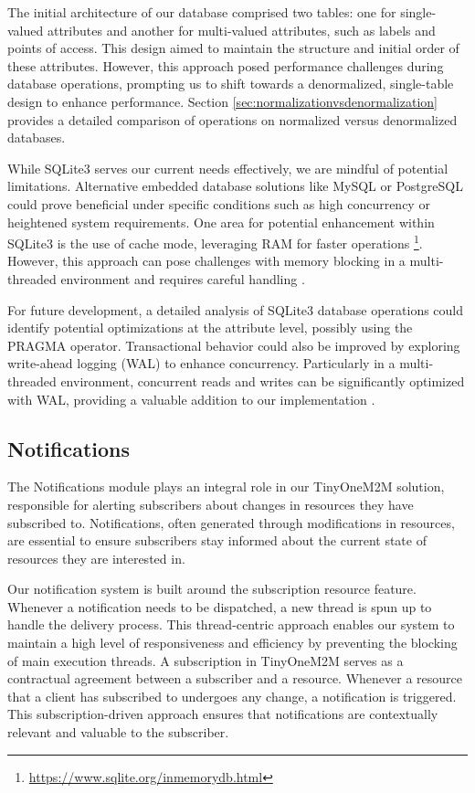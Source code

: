 \documentclass[a4paper,fleqn]{cas-dc}
\begin{document}
The initial architecture of our database comprised two tables: one for single-valued attributes and another for multi-valued attributes, such as labels and points of access. This design aimed to maintain the structure and initial order of these attributes. However, this approach posed performance challenges during database operations, prompting us to shift towards a denormalized, single-table design to enhance performance. Section \ref{sec:normalizationvsdenormalization} provides a detailed comparison of operations on normalized versus denormalized databases.

While SQLite3 serves our current needs effectively, we are mindful of potential limitations. Alternative embedded database solutions like MySQL or PostgreSQL could prove beneficial under specific conditions such as high concurrency or heightened system requirements. One area for potential enhancement within SQLite3 is the use of cache mode, leveraging RAM for faster operations \footnote{\url{https://www.sqlite.org/inmemorydb.html}}. However, this approach can pose challenges with memory blocking in a multi-threaded environment and requires careful handling \cite{}.

For future development, a detailed analysis of SQLite3 database operations could identify potential optimizations at the attribute level, possibly using the PRAGMA operator. Transactional behavior could also be improved by exploring write-ahead logging (WAL) to enhance concurrency. Particularly in a multi-threaded environment, concurrent reads and writes can be significantly optimized with WAL, providing a valuable addition to our implementation \cite{}.

\subsection{Notifications}

The Notifications module plays an integral role in our TinyOneM2M solution, responsible for alerting subscribers about changes in resources they have subscribed to. Notifications, often generated through modifications in resources, are essential to ensure subscribers stay informed about the current state of resources they are interested in.

Our notification system is built around the subscription resource feature. Whenever a notification needs to be dispatched, a new thread is spun up to handle the delivery process. This thread-centric approach enables our system to maintain a high level of responsiveness and efficiency by preventing the blocking of main execution threads. A subscription in TinyOneM2M serves as a contractual agreement between a subscriber and a resource. Whenever a resource that a client has subscribed to undergoes any change, a notification is triggered. This subscription-driven approach ensures that notifications are contextually relevant and valuable to the subscriber.
\end{document}
